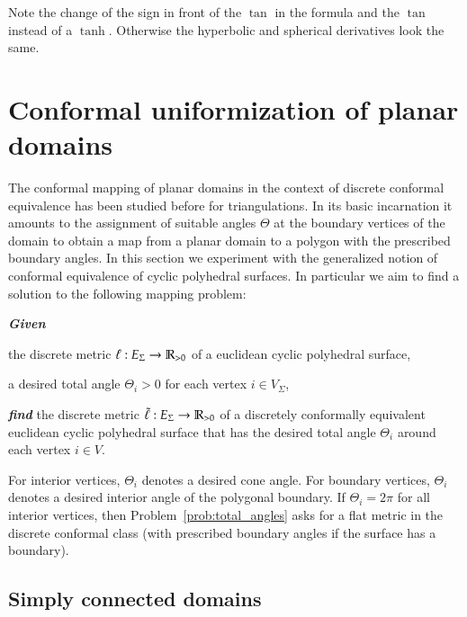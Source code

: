 \documentclass[Thesis]{subfiles}
\begin{document}
Note the change of the sign in front of the $\tan$ in the formula and the $\tan$ instead of a $\tanh$. Otherwise the hyperbolic and spherical 
derivatives look the same.


\section{Conformal uniformization of planar domains}

The conformal mapping of planar domains in the context of discrete conformal equivalence has been studied before for triangulations. 
In its basic incarnation it amounts to the assignment of suitable angles $\Theta$ at the boundary vertices of the domain to obtain a map from a planar domain to a polygon with the prescribed boundary angles. 
In this section we experiment with the generalized notion of conformal equivalence of cyclic polyhedral surfaces.
In particular we aim to find a solution to the following mapping problem:

\begin{problem}
\label{prob:total_angles}
\textbf{\itshape{Given}}

\begin{compactitem}
\item the discrete metric $\ell:E_{\Sigma}\rightarrow\mathbb R_{>0}$ of a
euclidean cyclic polyhedral surface,
\item a desired total angle $\Theta_{i}>0$ for each vertex
$i\in V_{\Sigma}$,
\end{compactitem}

\smallskip\noindent%
\textbf{\itshape{find}} the discrete metric
$\tilde\ell:E_{\Sigma}\rightarrow\mathbb R_{>0}$ of a discretely
conformally equivalent euclidean cyclic polyhedral surface that has
the desired total angle $\Theta_{i}$ around each vertex $i\in
V$.
\end{problem}

For interior vertices, $\Theta_i$ denotes a desired cone angle. For
boundary vertices, $\Theta_i$ denotes a desired interior angle of the
polygonal boundary. If $\Theta_{i}=2\pi$ for all interior vertices,
then Problem~\ref{prob:total_angles} asks for a flat metric in the
discrete conformal class (with prescribed boundary angles if the
surface has a boundary).


\subsection{Simply connected domains}
\end{document}
